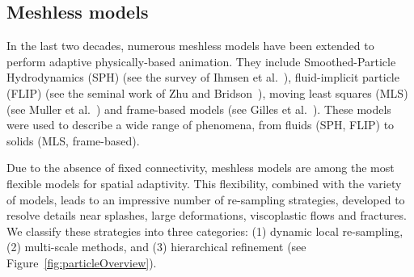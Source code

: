 \subsection{Meshless models}
\label{sec:meshless}
In the last two decades, numerous meshless models have been extended to perform adaptive physically-based animation. They include Smoothed-Particle Hydrodynamics (SPH) (see the survey of Ihmsen et al.~\cite{Ihmsen2014:STAR}), fluid-implicit particle (FLIP) (see the seminal work of Zhu and Bridson~\cite{Zhu2005}), moving least squares (MLS) (see Muller et al.~\cite{Muller2004:melting}) and frame-based models (see Gilles et al.~\cite{Gilles2011}). These models were used to describe a wide range of phenomena, from fluids (SPH, FLIP) to solids (MLS, frame-based).

Due to the absence of fixed connectivity, meshless models are among the most flexible models for spatial adaptivity. This flexibility, combined with the variety of models, leads to an impressive number of re-sampling strategies, developed to resolve details near splashes, large deformations, viscoplastic flows and fractures. We classify these strategies into three categories: (1) dynamic local re-sampling, (2) multi-scale methods, and (3) hierarchical refinement (see Figure~\ref{fig:particleOverview}).
